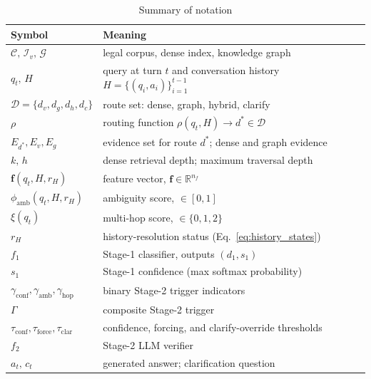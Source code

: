 \begin{table}[!htbp]
\centering
\caption{Summary of notation}\label{tab:notation}
\begin{tabularx}{\columnwidth}{L{2.1cm}Y}
\toprule
\textbf{Symbol} & \textbf{Meaning} \\
\midrule
$\mathcal{C},\,\mathcal{I}_v,\,\mathcal{G}$ & legal corpus, dense index, knowledge graph \\
$q_t,\,H$ & query at turn $t$ and conversation history $H=\{(q_i,a_i)\}_{i=1}^{t-1}$ \\
$\mathcal{D}=\{d_v,d_g,d_h,d_c\}$ & route set: dense, graph, hybrid, clarify \\
$\rho$ & routing function $\rho(q_t,H)\!\to\! d^*\!\in\!\mathcal{D}$ \\
$E_{d^*},E_v,E_g$ & evidence set for route $d^*$; dense and graph evidence \\
$k,\,h$ & dense retrieval depth; maximum traversal depth \\
$\mathbf{f}(q_t,H,r_H)$ & feature vector, $\mathbf{f}\in\mathbb{R}^{n_f}$ \\
$\phi_{\mathrm{amb}}(q_t,H,r_H)$ & ambiguity score, $\in[0,1]$ \\
$\xi(q_t)$ & multi-hop score, $\in\{0,1,2\}$ \\
$r_H$ & history-resolution status (Eq.~\ref{eq:history_states}) \\
$f_1$ & Stage-1 classifier, outputs $(d_1,s_1)$ \\
$s_1$ & Stage-1 confidence (max softmax probability) \\
$\gamma_{\mathrm{conf}},\gamma_{\mathrm{amb}},\gamma_{\mathrm{hop}}$ & binary Stage-2 trigger indicators \\
$\Gamma$ & composite Stage-2 trigger \\
$\tau_{\mathrm{conf}},\tau_{\mathrm{force}},\tau_{\mathrm{clar}}$ & confidence, forcing, and clarify-override thresholds \\
$f_2$ & Stage-2 LLM verifier \\
$a_t,\,c_t$ & generated answer; clarification question \\
\bottomrule
\end{tabularx}
\end{table}

